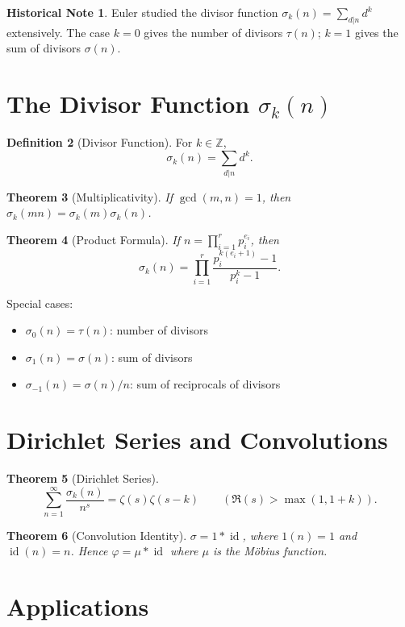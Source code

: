 \documentclass[11pt,a4paper,twoside]{book}
\theoremstyle{eulerstyle}
\newtheorem{theorem}{Theorem}[chapter]
\theoremstyle{definition}
\newtheorem{definition}[theorem]{Definition}
\newtheorem{historical}[theorem]{Historical Note}
\newcommand{\Z}{\mathbb{Z}}
\DeclareMathOperator{\id}{id}
\begin{document}
\begin{historical}
Euler studied the divisor function $\sigma_k(n) = \sum_{d|n} d^k$ extensively. The case $k=0$ gives the number of divisors $\tau(n)$; $k=1$ gives the sum of divisors $\sigma(n)$.
\end{historical}

\section{The Divisor Function $\sigma_k(n)$}

\begin{definition}[Divisor Function]
For $k \in \Z$,
\[
\sigma_k(n) = \sum_{d|n} d^k.
\]
\end{definition}

\begin{theorem}[Multiplicativity]
If $\gcd(m,n)=1$, then $\sigma_k(mn) = \sigma_k(m)\sigma_k(n)$.
\end{theorem}

\begin{theorem}[Product Formula]
If $n = \prod_{i=1}^r p_i^{e_i}$, then
\[
\sigma_k(n) = \prod_{i=1}^r \frac{p_i^{k(e_i+1)} - 1}{p_i^k - 1}.
\]
\end{theorem}

Special cases:
\begin{itemize}
    \item $\sigma_0(n) = \tau(n)$: number of divisors
    \item $\sigma_1(n) = \sigma(n)$: sum of divisors
    \item $\sigma_{-1}(n) = \sigma(n)/n$: sum of reciprocals of divisors
\end{itemize}

\section{Dirichlet Series and Convolutions}

\begin{theorem}[Dirichlet Series]
\[
\sum_{n=1}^\infty \frac{\sigma_k(n)}{n^s} = \zeta(s) \zeta(s-k) \qquad (\Re(s) > \max(1, 1+k)).
\]
\end{theorem}

\begin{theorem}[Convolution Identity]
$\sigma = 1 * \id$, where $1(n)=1$ and $\id(n)=n$. Hence $\varphi = \mu * \id$ where $\mu$ is the Möbius function.
\end{theorem}

\section{Applications}
\end{document}
